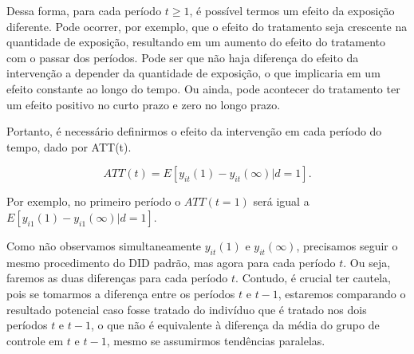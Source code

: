 \documentclass[portugues]{article}
\begin{document}
\begin{figure}[!h]
    \centering
{}
\end{figure}

Dessa forma, para cada período $t\geq1$, é possível termos um efeito da exposição diferente. Pode ocorrer, por exemplo, que o efeito do tratamento seja crescente na quantidade de exposição, resultando em um aumento do efeito do tratamento com o passar dos períodos. Pode ser que não haja diferença do efeito da intervenção a depender da quantidade de exposição, o que implicaria em um efeito constante ao longo do tempo. Ou ainda, pode acontecer do tratamento ter um efeito positivo no curto prazo e zero no longo prazo.

Portanto, é necessário definirmos o efeito da intervenção em cada período do tempo, dado por ATT(t). 

\[
ATT(t) = E[y_{it}(1) - y_{it}(\infty)|d=1].
\]

\noindent Por exemplo, no primeiro período o $ATT(t=1)$ será igual a $E[y_{i1}(1) - y_{i1}(\infty)|d=1]$.

Como não observamos simultaneamente $y_{it}(1)$ e $y_{it}(\infty)$, precisamos seguir o mesmo procedimento do DID padrão, mas agora para cada período $t$. Ou seja, faremos as duas diferenças para cada período $t$. Contudo, é crucial ter cautela, pois se tomarmos a diferença entre os períodos $t$ e $t-1$, estaremos comparando o resultado potencial caso fosse tratado do indivíduo que é tratado nos dois períodos $t$ e $t-1$, o que não é equivalente à diferença da média do grupo de controle em $t$ e $t-1$, mesmo se assumirmos tendências paralelas.
\end{document}
